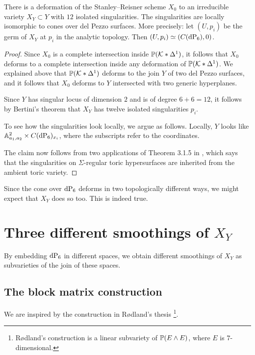 \begin{proposition}
There is a deformation of the Stanley--Reisner scheme $X_0$ to an irreducible \CY variety $X_Y \subset Y$ with $12$ isolated singularities. The singularities are locally isomorphic to cones over del Pezzo surfaces. More precisely: let $(U,p_i)$ be the germ of $X_Y$ at $p_i$ in the analytic topology. Then $(U,p_i) \simeq (C(\dP6),0)$.
\end{proposition}
\begin{proof}
Since $X_0$ is a complete intersection inside $\P(\K \ast \Delta^1)$, it follows that $X_0$ deforms to a complete intersection inside any deformation of $\P(\K \ast \Delta^1)$. We explained above that $\P(\K \ast \Delta^1)$ deforms to the join $Y$ of two del Pezzo surfaces, and it follows that $X_0$ deforms to $Y$ intersected with two generic hyperplanes.

Since $Y$ has singular locus of dimension $2$ and is of degree $6+6=12$, it follows by Bertini's theorem \cite[Chapter II, Theorem 8.18]{hartshorne} that $X_Y$ has twelve isolated singularities $p_i$.

To see how the singularities look locally, we argue as follows. Locally, $Y$ looks like $\A^2_{a_1,a_2} \times C(\dP6)_{x_i}$, where the subscripts refer to the coordinates.

The claim now follows from two applications of Theorem 3.1.5 in \cite{batyrev_mirrorsymmetry}, which says that the singularities on $\Sigma$-regular toric hypersurfaces are inherited from the ambient toric variety.
\end{proof}

Since the cone over $\dP6$ deforms in two topologically different ways, we might expect that $X_Y$ does so too. This is indeed true.

\section{Three different smoothings of $X_Y$}

By embedding $\dP6$ in different spaces, we obtain different smoothings of $X_Y$ as subvarieties of the join of these spaces.

\subsection{The block matrix construction}

We are inspired by the construction in Rødland's thesis \cite{rodland_pfaffian}\footnote{Rødland's construction is a linear subvariety of $\P(E \wedge E)$, where $E$ is $7$-dimensional.}.

